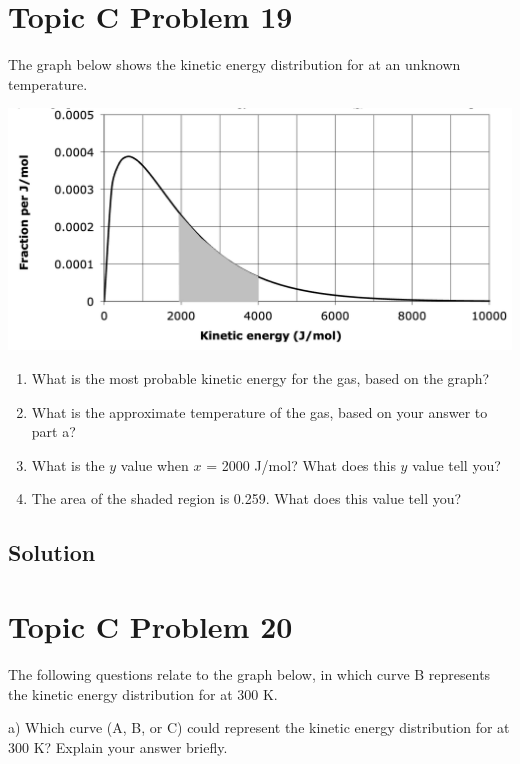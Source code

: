 \documentclass[10pt]{article}
\begin{document}
    \pagebreak
    \section{Topic C Problem 19}
        The graph below shows the kinetic energy distribution for  at an unknown temperature.
        \begin{center}
            \includegraphics[width=\textwidth]{picture_C-19.png}
        \end{center}
        
        \begin{enumerate} [label=\alph*)]
            \item What is the most probable kinetic energy for the gas, based on the graph?
            \item What is the approximate temperature of the gas, based on your answer to part a?
            \item What is the $y$ value when $x$ = 2000 J/mol? What does this $y$ value tell you?
            \item The area of the shaded region is 0.259. What does this value tell you?
        \end{enumerate}

        \subsection{Solution}

    \pagebreak
    \section{Topic C Problem 20}
        The following questions relate to the graph below, in which curve B represents the kinetic energy distribution for  at 300 K.

        a) Which curve (A, B, or C) could represent the kinetic energy distribution for  at 300 K? Explain your answer briefly.
\end{document}
